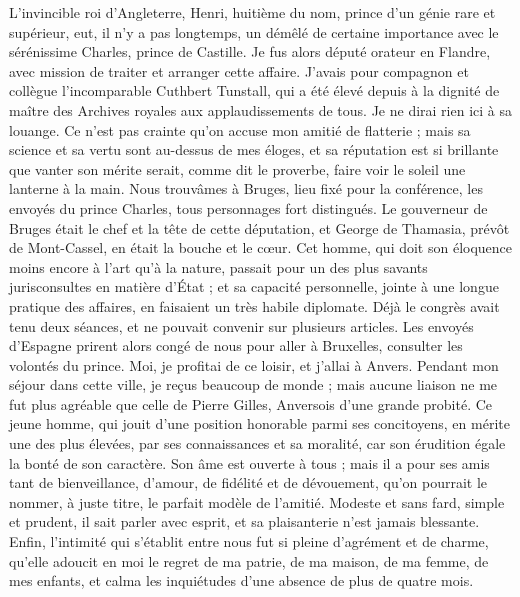 \documentclass[12pt,a4paper]{book}
\begin{document}
\begin{pages}
    \begin{Rightside} 
        \beginnumbering
        \pstart
        L'invincible roi d'Angleterre, Henri, huitième du nom, prince d'un génie rare et supérieur, eut, il n'y a pas longtemps, un démêlé de certaine importance avec le sérénissime Charles, prince de Castille. Je fus alors député orateur en Flandre, avec mission de traiter et arranger cette affaire. J'avais pour compagnon et collègue l'incomparable Cuthbert Tunstall, qui a été élevé depuis à la dignité de maître des Archives royales aux applaudissements de tous. Je ne dirai rien ici à sa louange. Ce n'est pas crainte qu'on accuse mon amitié de flatterie ; mais sa science et sa vertu sont au-dessus de mes éloges, et sa réputation est si brillante que vanter son mérite serait, comme dit le proverbe, faire voir le soleil une lanterne à la main.
		\pend
		\pstart
        Nous trouvâmes à Bruges, lieu fixé pour la conférence, les envoyés du prince Charles, tous personnages fort distingués. Le gouverneur de Bruges était le chef et la tête de cette députation, et George de Thamasia, prévôt de Mont-Cassel, en était la bouche et le cœur. Cet homme, qui doit son éloquence moins encore à l'art qu'à la nature, passait pour un des plus savants jurisconsultes en matière d'État ; et sa capacité personnelle, jointe à une longue pratique des affaires, en faisaient un très habile diplomate. Déjà le congrès avait tenu deux séances, et ne pouvait convenir sur plusieurs articles. Les envoyés d'Espagne prirent alors congé de nous pour aller à Bruxelles, consulter les volontés du prince. 
        \pend
		\pstart
        Moi, je profitai de ce loisir, et j'allai à Anvers. Pendant mon séjour dans cette ville, je reçus beaucoup de monde ; mais aucune liaison ne me fut plus agréable que celle de Pierre Gilles, Anversois d'une grande probité. Ce jeune homme, qui jouit d'une position honorable parmi ses concitoyens, en mérite une des plus élevées, par ses connaissances et sa moralité, car son érudition égale la bonté de son caractère. Son âme est ouverte à tous ; mais il a pour ses amis tant de bienveillance, d'amour, de fidélité et de dévouement, qu'on pourrait le nommer, à juste titre, le parfait modèle de l'amitié. Modeste et sans fard, simple et prudent, il sait parler avec esprit, et sa plaisanterie n'est jamais blessante. Enfin, l'intimité qui s'établit entre nous fut si pleine d'agrément et de charme, qu'elle adoucit en moi le regret de ma patrie, de ma maison, de ma femme, de mes enfants, et calma les inquiétudes d'une absence de plus de quatre mois. 
		\pend
		\pstart

\end{Rightside}
\end{pages}
\end{document}
